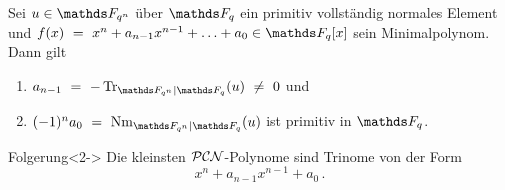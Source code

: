 \documentclass{vorlage}
\begin{document}
\begin{frame}
  \begin{lemma}
    Sei $u \in \F_{q^n}$ über $\F_q$ ein primitiv vollständig normales Element
    und $f(x) \speq= x^n + a_{n-1}x^{n-1}+\ldots+a_0 \in \F_q[x]$ 
    sein Minimalpolynom. Dann gilt
    \begin{enumerate}
      \item $a_{n-1} \speq= -\Tr_{\F_{q^n}\mid \F_q}(u) \speq\neq 0$ und 
      \item $(-1)^na_0 \speq= \Nm_{\F_{q^n}\mid \F_q}(u)$ ist primitiv in $\F_q$.
    \end{enumerate}
  \end{lemma}

  \begin{block}{Folgerung}<2->
    Die kleinsten $\mathcal{PCN}$-Polynome sind Trinome  von der Form
    \[ x^n + a_{n-1} x^{n-1} + a_0\,.\]
  \end{block}
\end{frame}
\end{document}
